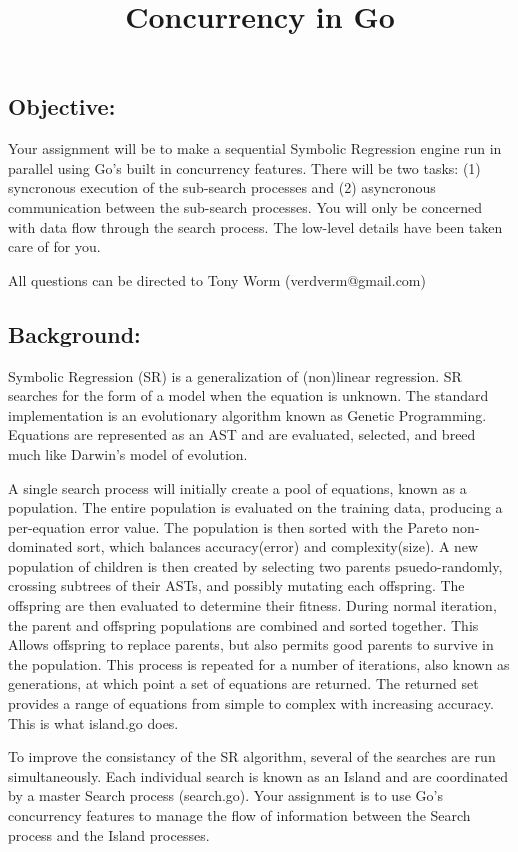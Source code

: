 \documentclass[a4paper,10pt]{article}
\begin{document}
\title{Concurrency in Go}
\maketitle

\subsection*{Objective:}
Your assignment will be to make a 
sequential Symbolic Regression engine
run in parallel using Go's built in concurrency features.
There will be two tasks:
(1) syncronous execution of the sub-search processes and
(2) asyncronous communication between the sub-search processes. 
You will only be concerned with data flow through the
search process. The low-level details have been taken care of for you.

\noindent
All questions can be directed to Tony Worm (verdverm@gmail.com)

\subsection*{Background:}
Symbolic Regression (SR) is a generalization of (non)linear regression.
SR searches for the form of a model when the equation is unknown.
The standard implementation is an evolutionary algorithm known as Genetic Programming.
Equations are represented as an AST and are evaluated, selected, and breed
much like Darwin's model of evolution.

A single search process will initially create a pool of equations,
known as a population. The entire population is evaluated on the
training data, producing a per-equation error value.
The population is then sorted with the Pareto non-dominated sort,
which balances accuracy(error) and complexity(size).
A new population of children is then created by selecting
two parents psuedo-randomly, crossing subtrees of their ASTs,
and possibly mutating each offspring.
The offspring are then evaluated to determine their fitness.
During normal iteration, the parent and offspring populations
are combined and sorted together. This Allows offspring to 
replace parents, but also permits good parents to survive in
the population. This process is repeated for a number of iterations,
also known as generations, at which point a set of equations
are returned. The returned set provides a range of equations
from simple to complex with increasing accuracy.
This is what island.go does.

To improve the consistancy of the SR algorithm,
several of the searches are run simultaneously.
Each individual search is known as an Island
and are coordinated by a master Search 
process (search.go). Your assignment
is to use Go's concurrency features
to manage the flow of information
between the Search process
and the Island processes.
\end{document}
